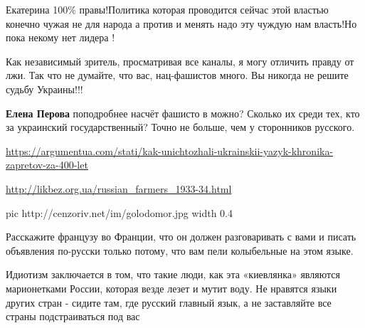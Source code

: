 Екатерина 100\% правы!Политика которая проводится сейчас этой властью конечно
чужая не для народа а против и менять надо эту чуждую нам власть!Но пока некому
нет лидера !


Как независимый зритель, просматривая все каналы, я могу отличить правду от
лжи. Так что не думайте, что вас, нац-фашистов много. Вы никогда не решите
судьбу Украины!!!

\begin{itemize}
\textbf{Елена Перова} поподробнее насчёт фашисто в можно? Сколько их среди тех, кто за украинский государственный? Точно не больше, чем у сторонников русского.


\url{https://argumentua.com/stati/kak-unichtozhali-ukrainskii-yazyk-khronika-zapretov-za-400-let}\par
\url{http://likbez.org.ua/russian_farmers_1933-34.html}\par

\ifcmt
  pic http://cenzoriv.net/im/golodomor.jpg
  width 0.4
\fi

\end{itemize}


Расскажите французу во Франции, что он должен разговаривать с вами и писать
объявления по-русски только потому, что вам пели колыбельные на этом языке.

Идиотизм заключается в том, что такие люди, как эта «киевлянка» являются
марионетками России, которая везде лезет и мутит воду. Не нравятся языки других
стран - сидите там, где русский главный язык, а не заставляйте все страны
подстраиваться под вас

